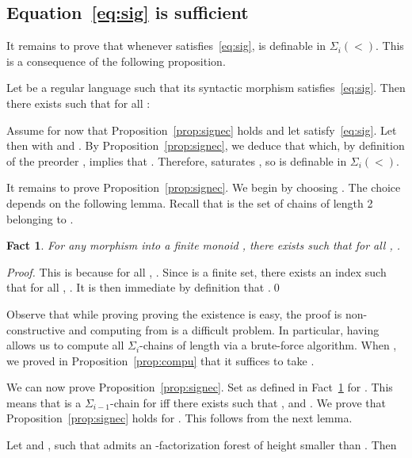 \documentclass[envcountsame]{llncs}
\newcommand{\sic}[1]{\ensuremath{\Sigma_{#1}}\xspace}
\newcommand{\siw}[1]{\ensuremath{\Sigma_{#1}(<)}\xspace}
\newcommand\qchain[1]{\ensuremath{\sic{#1}}-chain\xspace}
\newcommand\qchains[1]{\ensuremath{\sic{#1}}-chains\xspace}
\newcommand\ichains{\qchains{i}}
\newtheorem{fact}[theorem]{Fact}
\begin{document}
\subsection{Equation~\eqref{eq:sig} is sufficient}

It remains to prove that whenever  satisfies~\eqref{eq:sig},
 is definable in \siw{i}. This is a consequence of the following
proposition.

\begin{proposition} \label{prop:signec}
  Let  be a regular language such that its syntactic morphism  satisfies~\eqref{eq:sig}. Then there exists  such that for all :
  
\end{proposition}
Assume for now that Proposition~\ref{prop:signec} holds and let
 satisfy~\eqref{eq:sig}. Let then  with 
and . By Proposition~\ref{prop:signec}, we deduce that
 which, by definition of the preorder ,
implies that . Therefore,  saturates , so  is
definable in \siw{i}.

It remains to prove Proposition~\ref{prop:signec}. We begin by
choosing . The choice depends on the following lemma. Recall that
 is the set of chains of length 2 belonging
to .

\begin{fact} \label{fct:boundk}
  For any morphism  into a finite monoid ,
  there exists  such that for all ,
  .
\end{fact}

\begin{proof}
  This is because for all , . Since  is a finite set, there
  exists an index  such that for all ,
  . It is then
  immediate by definition that .\qed
\end{proof}

Observe that while proving proving the existence  is easy, the
proof is non-constructive and computing  from  is a
difficult problem. In particular, having  allows us to compute all
\ichains of length  via a brute-force algorithm. When , we
proved in Proposition~\ref{prop:compu} that it suffices to take .

We can now prove Proposition~\ref{prop:signec}. Set  as defined
in Fact~\ref{fct:boundk} for . This means that  is a
\qchain{i-1} for  iff there exists  such that
,  and . We prove
that Proposition~\ref{prop:signec} holds for . This
follows from the next lemma.


\begin{lemma} \label{lem:factosig}
  Let  and , such that  admits an
  -factorization forest of height smaller than . Then  
  
\end{lemma}
\end{document}
